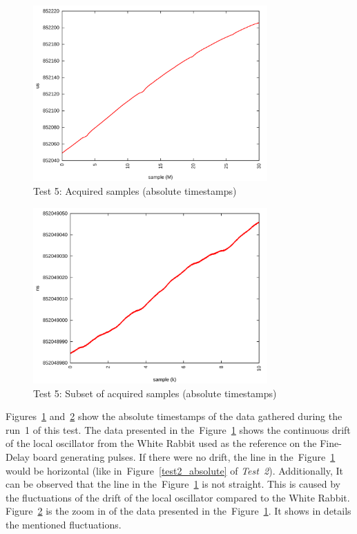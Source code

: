 \documentclass[a4paper, 12pt]{article}
\begin{document}
\begin{figure}[ht!]
  \centering
   \includegraphics[width=0.80\textwidth]{img/test5_samples_absolute.png}
  \caption{Test 5: Acquired samples (absolute timestamps)}
  \label{test5_absolute}
\end{figure}

\begin{figure}[ht!]
  \centering
   \includegraphics[width=0.80\textwidth]{img/test5_samples_absolute_zoom.png}
  \caption{Test 5: Subset of acquired samples (absolute timestamps)}
  \label{test5_absolute_zoom}
\end{figure}

Figures~\ref{test5_absolute} and~\ref{test5_absolute_zoom} show the absolute
timestamps of the data gathered during the run~1 of this test.
The data presented in the~Figure~\ref{test5_absolute} shows the continuous
drift of the local oscillator from the White Rabbit used as the reference on
the Fine-Delay board generating pulses.
If there were no drift, the line in the~Figure~\ref{test5_absolute} would be
horizontal (like in~Figure~\ref{test2_absolute} of \textit{Test~2}).
Additionally, It can be observed that the line in
the~Figure~\ref{test5_absolute} is not straight.
This is caused by the fluctuations of the drift of the local oscillator
compared to the White Rabbit.
Figure~\ref{test5_absolute_zoom} is the zoom in of the data presented in
the~Figure~\ref{test5_absolute}. It shows in details the mentioned fluctuations.
\end{document}
